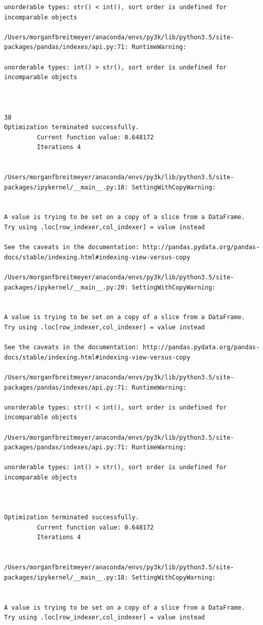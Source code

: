 \begin{lstlisting}
unorderable types: str() < int(), sort order is undefined for incomparable objects

/Users/morganfbreitmeyer/anaconda/envs/py3k/lib/python3.5/site-packages/pandas/indexes/api.py:71: RuntimeWarning:

unorderable types: int() > str(), sort order is undefined for incomparable objects



38
Optimization terminated successfully.
         Current function value: 0.648172
         Iterations 4


/Users/morganfbreitmeyer/anaconda/envs/py3k/lib/python3.5/site-packages/ipykernel/__main__.py:18: SettingWithCopyWarning:


A value is trying to be set on a copy of a slice from a DataFrame.
Try using .loc[row_indexer,col_indexer] = value instead

See the caveats in the documentation: http://pandas.pydata.org/pandas-docs/stable/indexing.html#indexing-view-versus-copy

/Users/morganfbreitmeyer/anaconda/envs/py3k/lib/python3.5/site-packages/ipykernel/__main__.py:20: SettingWithCopyWarning:


A value is trying to be set on a copy of a slice from a DataFrame.
Try using .loc[row_indexer,col_indexer] = value instead

See the caveats in the documentation: http://pandas.pydata.org/pandas-docs/stable/indexing.html#indexing-view-versus-copy

/Users/morganfbreitmeyer/anaconda/envs/py3k/lib/python3.5/site-packages/pandas/indexes/api.py:71: RuntimeWarning:

unorderable types: str() < int(), sort order is undefined for incomparable objects

/Users/morganfbreitmeyer/anaconda/envs/py3k/lib/python3.5/site-packages/pandas/indexes/api.py:71: RuntimeWarning:

unorderable types: int() > str(), sort order is undefined for incomparable objects



Optimization terminated successfully.
         Current function value: 0.648172
         Iterations 4


/Users/morganfbreitmeyer/anaconda/envs/py3k/lib/python3.5/site-packages/ipykernel/__main__.py:18: SettingWithCopyWarning:


A value is trying to be set on a copy of a slice from a DataFrame.
Try using .loc[row_indexer,col_indexer] = value instead


\end{lstlisting}

